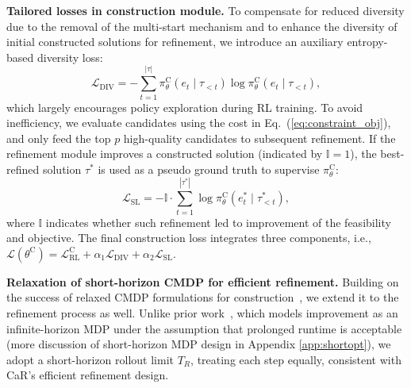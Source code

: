 \documentclass{article} %
\begin{document}
\textbf{Tailored losses in construction module.} To compensate for reduced diversity due to the removal of the multi-start mechanism and to enhance the diversity of initial constructed solutions for refinement, we introduce an auxiliary entropy-based diversity loss:
\begin{equation}
    \mathcal{L}_\text{DIV} = - \sum_{t=1}^{|\tau|} \pi_\theta^{\text{C}}(e_t \mid \tau_{<t}) \log \pi_\theta^{\text{C}}(e_t \mid \tau_{<t}),
    \label{eq:div}
\end{equation}
which largely encourages policy exploration during RL training. To avoid inefficiency, we evaluate candidates using the cost in Eq.~(\ref{eq:constraint_obj}), and only feed the top $p$ high-quality candidates to subsequent refinement. If the refinement module improves a constructed solution (indicated by $\mathbb{I}=1$), the best-refined solution $\tau^*$ is used as a pseudo ground truth to supervise $\pi_\theta^{\text{C}}$: 
\begin{equation}
    \mathcal{L}_\text{SL} = - \mathbb{I} \cdot \sum_{t=1}^{|\tau^*|} \log \pi_\theta^{\text{C}}(e_t^* \mid \tau^*_{<t}),
    \label{eq:sl}
\end{equation}
where $\mathbb{I}$ indicates whether such refinement led to improvement of the feasibility and objective. The final construction loss integrates three components, i.e., 
$\mathcal{L}(\theta^\text{C}) = \mathcal{L}_\text{RL}^\text{C} + \alpha_1 \mathcal{L}_\text{DIV} + \alpha_2 \mathcal{L}_\text{SL}$. 

\textbf{Relaxation of short-horizon CMDP for efficient refinement.} 
Building on the success of relaxed CMDP formulations for construction~\citep{bi2024learning}, we extend it to the refinement process as well. {Unlike prior work~\citep{kong2024efficient, ma2023learning}, which models improvement as an infinite-horizon MDP under the assumption that prolonged runtime is acceptable (more discussion of short-horizon MDP design in Appendix \ref{app:shortopt}), we adopt a short-horizon rollout limit $T_R$, treating each step equally, consistent with CaR’s efficient refinement design.}
\end{document}
